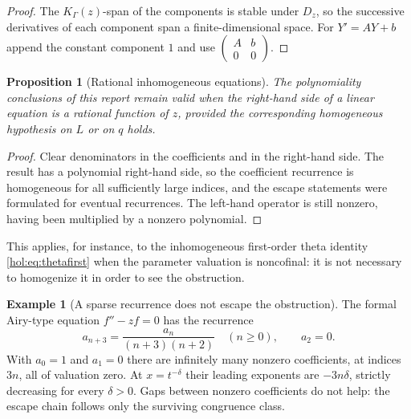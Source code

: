 \documentclass[11pt]{article}
\numberwithin{equation}{section}
\newtheorem{proposition}[theorem]{Proposition}
\theoremstyle{definition}
\newtheorem{example}[theorem]{Example}
\theoremstyle{remark}
\newcommand{\K}{K_\Gamma}
\begin{document}
\begin{proof}
The $\K(z)$-span of the components is stable under $D_z$, so the successive
derivatives of each component span a finite-dimensional space. For $Y'=AY+b$
append the constant component $1$ and use
$\left(\begin{smallmatrix}A&b\\0&0\end{smallmatrix}\right)$.
\end{proof}

\begin{proposition}[Rational inhomogeneous equations]
\label{hol:prop:inhomogeneous}
The polynomiality conclusions of this report remain valid when the right-hand
side of a linear equation is a rational function of $z$, provided the
corresponding homogeneous hypothesis on $L$ or on $q$ holds.
\end{proposition}

\begin{proof}
Clear denominators in the coefficients and in the right-hand side. The result
has a polynomial right-hand side, so the coefficient recurrence is homogeneous
for all sufficiently large indices, and the escape statements were formulated
for eventual recurrences. The left-hand operator is still nonzero, having been
multiplied by a nonzero polynomial.
\end{proof}

This applies, for instance, to the inhomogeneous first-order theta identity
\eqref{hol:eq:thetafirst} when the parameter valuation is noncofinal: it is
not necessary to homogenize it in order to see the obstruction.

\begin{example}[A sparse recurrence does not escape the obstruction]
\label{hol:ex:airy}
The formal Airy-type equation $f''-zf=0$ has the recurrence
\[
 a_{n+3}=\frac{a_n}{(n+3)(n+2)}\quad(n\ge0),\qquad a_2=0.
\]
With $a_0=1$ and $a_1=0$ there are infinitely many nonzero coefficients, at
indices $3n$, all of valuation zero. At $x=t^{-\delta}$ their leading
exponents are $-3n\delta$, strictly decreasing for every $\delta>0$. Gaps
between nonzero coefficients do not help: the escape chain follows only the
surviving congruence class.
\end{example}
\end{document}
